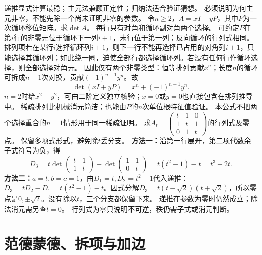 {递推显式计算最稳；主元法兼顾正定性；归纳法适合验证猜想。}
{必须说明为何主元非零，不能先除一个尚未证明非零的参数。}
{令$n\ge2$，$A=xI+yP$，其中$P$为一次循环移位矩阵。求$\det A$。}
{每行只有对角和循环副对角两个选择。}
{可约定$P$在第$i$行的非零元位于循环下一列$i+1$，末行位于第一列；反向循环的行列式相同。排列项若在某行$i$选择循环列$i+1$，则下一行不能再选择已占用的对角列$i+1$，只能选择其循环列；如此绕一圈，迫使全部行都选择循环列。若没有任何行作循环选择，则全部选择对角元。
因此仅有两个非零类型：恒等排列贡献$x^n$；长度$n$的循环可拆成$n-1$次对换，贡献$(-1)^{n-1}y^n$。故
\[\det(xI+yP)=x^n+(-1)^{n-1}y^n.\]
$n=2$时给$x^2-y^2$，可由二阶定义独立核验；$x=0$或$y=0$也直接包含在排列推导中。}
{稀疏排列比机械消元简洁；也能由$P$的$n$次单位根特征值验证。}
{本公式不把两个选择重合的$n=1$情形用于同一稀疏证明。}
{求$A_t=\begin{pmatrix}t&1&0\\1&t&1\\0&1&t\end{pmatrix}$的行列式及零点。}
{保留多项式形式，避免除$t$丢分支。}
{\textbf{方法一：}沿第一行展开，第二项代数余子式符号为负，得
\[D_3=t\det\begin{pmatrix}t&1\\1&t\end{pmatrix}-\det\begin{pmatrix}1&1\\0&t\end{pmatrix}=t(t^2-1)-t=t^3-2t.\]
\textbf{方法二：}$a=t,b=c=1$，由$D_1=t,D_2=t^2-1$代入递推：$D_3=tD_2-D_1=t(t^2-1)-t$。因式分解$D_3=t(t-\sqrt2)(t+\sqrt2)$，所以零点是$0,\pm\sqrt2$。没有除以$t$，三个分支都保留下来。}
{递推在参数为零时仍然成立；除法消元需另查$t=0$。}
{行列式为零只说明不可逆，秩仍需子式或消元判断。}
\section{范德蒙德、拆项与加边}
